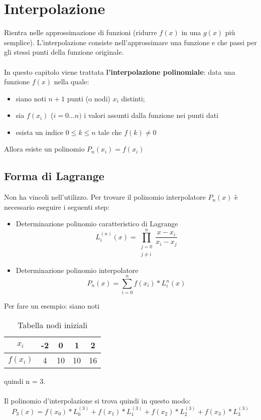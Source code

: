 \section{Interpolazione}
\label{Interpolazione}
Rientra nelle approssimazione di funzioni (ridurre $f(x)$ in una $g(x)$ più semplice). L'interpolazione consiste nell'approssimare una funzione e che passi per gli stessi punti della funzione originale.
\\
\\
In questo capitolo viene trattata \textbf{l'interpolazione polinomiale}: data una funzione $f(x)$ nella quale:
\begin{itemize}
\item siano noti $n+1$ punti (o nodi) $x_i$ distinti;
\item sia $f(x_i)$ ($i=0\dots n)$ i valori assunti dalla funzione nei punti dati
\item esista un indice $0\leq k\leq n$ tale che $f(k)\neq 0$ 
\end{itemize}
Allora esiste un polinomio $P_n(x_i) = f(x_i)$

\subsection{Forma di Lagrange}
\label{Forma di Lagrange}
Non ha vincoli nell'utilizzo. Per trovare il polinomio interpolatore $P_n(x)$ è necessario eseguire i seguenti step:
\begin{itemize}
\item Determinazione polinomio caratteristico di Lagrange  $$L^(n)_i(x) = \prod_{\substack{j=0 \\ j\neq i}}^{n} \frac{x-x_i}{x_i-x_j}$$
\item Determinazione polinomio interpolatore $$P_n(x)=\sum_{i=0}^{n}f(x_i)*L_i^n(x)$$
\end{itemize}
\noindent
\newpage
Per fare un esempio: siano noti 
\begin{table}[!h]
\centering
\begin{tabular}{|c|c c c c }
$x_i$ & -2 & 0 & 1 & 2 \\
\hline
$f(x_i)$ & 4 & 10 & 10 & 16
\end{tabular}
\caption{Tabella nodi iniziali}
\end{table}


\noindent quindi n = 3.
\\\\
Il polinomio d'interpolazione si trova quindi in questo modo: $$P_3(x) = f(x_0)*L^{(3)}_0  + f(x_1)*L^{(3)}_1 + f(x_2)*L^{(3)}_2 + f(x_3)*L^{(3)}_3$$

